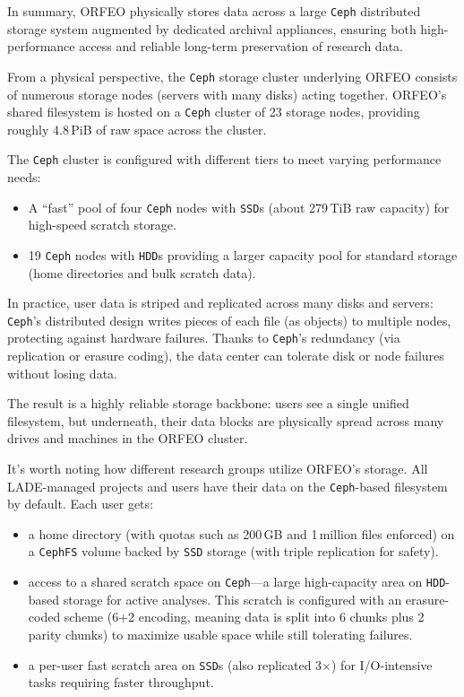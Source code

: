 In summary, ORFEO physically stores data across a large \texttt{Ceph} 
distributed storage system augmented by dedicated archival appliances, ensuring 
both high-performance access and reliable long-term preservation of research 
data.

\medskip

From a physical perspective, the \texttt{Ceph} storage cluster underlying ORFEO 
consists of numerous storage nodes (servers with many disks) acting together. 
ORFEO’s shared filesystem is hosted on a \texttt{Ceph} cluster of 23 storage 
nodes, providing roughly 4.8\,PiB of raw space across the 
cluster\parencite{ORFEO_Docs_Storage,orfeo-changelog-2024}. 

The \texttt{Ceph} cluster is configured with different tiers to meet varying 
performance needs:
\begin{itemize}
	\item A “fast” pool of four \texttt{Ceph} nodes with \texttt{SSD}s (about 
	279\,TiB raw capacity) for high-speed scratch storage.
	\item 19 \texttt{Ceph} nodes with \texttt{HDD}s providing a larger capacity 
	pool for standard storage (home directories and bulk scratch 
	data)\parencite{ORFEO_Docs_Storage}.
\end{itemize}

In practice, user data is striped and replicated across many disks and servers: 
\texttt{Ceph}’s distributed design writes pieces of each file (as objects) to 
multiple nodes, protecting against hardware failures. Thanks to \texttt{Ceph}’s 
redundancy (via replication or erasure coding), the data center can tolerate 
disk or node failures without losing data\parencite{Ceph_RADOS,Ceph_Pools,Ceph_EC}. 

The result is a highly reliable storage backbone: users see a single unified 
filesystem, but underneath, their data blocks are physically spread across many 
drives and machines in the ORFEO cluster.

\medskip

It’s worth noting how different research groups utilize ORFEO’s storage. All 
LADE-managed projects and users have their data on the \texttt{Ceph}-based 
filesystem by default. Each user gets:
\begin{itemize}
	\item a home directory (with quotas such as 200\,GB and 1\,million files 
	enforced) on a \texttt{CephFS} volume backed by \texttt{SSD} storage 
	(with triple replication for safety)\parencite{ORFEO_Docs_Storage}.
	\item access to a shared scratch space on \texttt{Ceph}—a large 
	high-capacity area on \texttt{HDD}-based storage for active analyses. This 
	scratch is configured with an erasure-coded scheme (6+2 encoding, meaning 
	data is split into 6 chunks plus 2 parity chunks) to maximize usable space 
	while still tolerating failures\parencite{Ceph_EC,Ceph_RADOS}.
	\item a per-user fast scratch area on \texttt{SSD}s (also replicated 3$\times$) 
	for I/O-intensive tasks requiring faster throughput\parencite{Ceph_Pools}.
\end{itemize}

